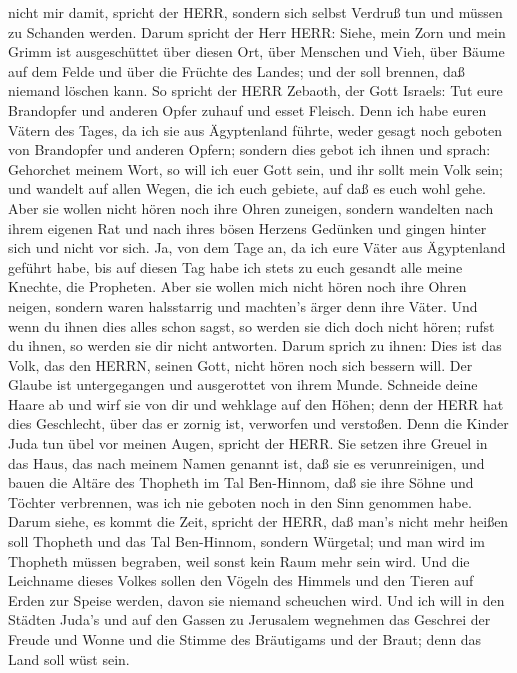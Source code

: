nicht mir damit, spricht der HERR, sondern sich selbst Verdruß tun und
müssen zu Schanden werden.  Darum spricht der Herr HERR:
Siehe, mein Zorn und mein Grimm ist ausgeschüttet über diesen Ort, über
Menschen und Vieh, über Bäume auf dem Felde und über die Früchte des
Landes; und der soll brennen, daß niemand löschen kann.  So
spricht der HERR Zebaoth, der Gott Israels: Tut eure Brandopfer und
anderen Opfer zuhauf und esset Fleisch.  Denn ich habe
euren Vätern des Tages, da ich sie aus Ägyptenland führte, weder gesagt
noch geboten von Brandopfer und anderen Opfern;  sondern
dies gebot ich ihnen und sprach: Gehorchet meinem Wort, so will ich euer
Gott sein, und ihr sollt mein Volk sein; und wandelt auf allen Wegen,
die ich euch gebiete, auf daß es euch wohl gehe.  Aber sie
wollen nicht hören noch ihre Ohren zuneigen, sondern wandelten nach
ihrem eigenen Rat und nach ihres bösen Herzens Gedünken und gingen
hinter sich und nicht vor sich.  Ja, von dem Tage an, da
ich eure Väter aus Ägyptenland geführt habe, bis auf diesen Tag habe ich
stets zu euch gesandt alle meine Knechte, die Propheten. 
Aber sie wollen mich nicht hören noch ihre Ohren neigen, sondern waren
halsstarrig und machten's ärger denn ihre Väter.  Und wenn
du ihnen dies alles schon sagst, so werden sie dich doch nicht hören;
rufst du ihnen, so werden sie dir nicht antworten.  Darum
sprich zu ihnen: Dies ist das Volk, das den HERRN, seinen Gott, nicht
hören noch sich bessern will. Der Glaube ist untergegangen und
ausgerottet von ihrem Munde.  Schneide deine Haare ab und
wirf sie von dir und wehklage auf den Höhen; denn der HERR hat dies
Geschlecht, über das er zornig ist, verworfen und verstoßen.
 Denn die Kinder Juda tun übel vor meinen Augen, spricht
der HERR. Sie setzen ihre Greuel in das Haus, das nach meinem Namen
genannt ist, daß sie es verunreinigen,  und bauen die
Altäre des Thopheth im Tal Ben-Hinnom, daß sie ihre Söhne und Töchter
verbrennen, was ich nie geboten noch in den Sinn genommen habe.
 Darum siehe, es kommt die Zeit, spricht der HERR, daß
man's nicht mehr heißen soll Thopheth und das Tal Ben-Hinnom, sondern
Würgetal; und man wird im Thopheth müssen begraben, weil sonst kein Raum
mehr sein wird.  Und die Leichname dieses Volkes sollen den
Vögeln des Himmels und den Tieren auf Erden zur Speise werden, davon sie
niemand scheuchen wird.  Und ich will in den Städten Juda's
und auf den Gassen zu Jerusalem wegnehmen das Geschrei der Freude und
Wonne und die Stimme des Bräutigams und der Braut; denn das Land soll
wüst sein.

